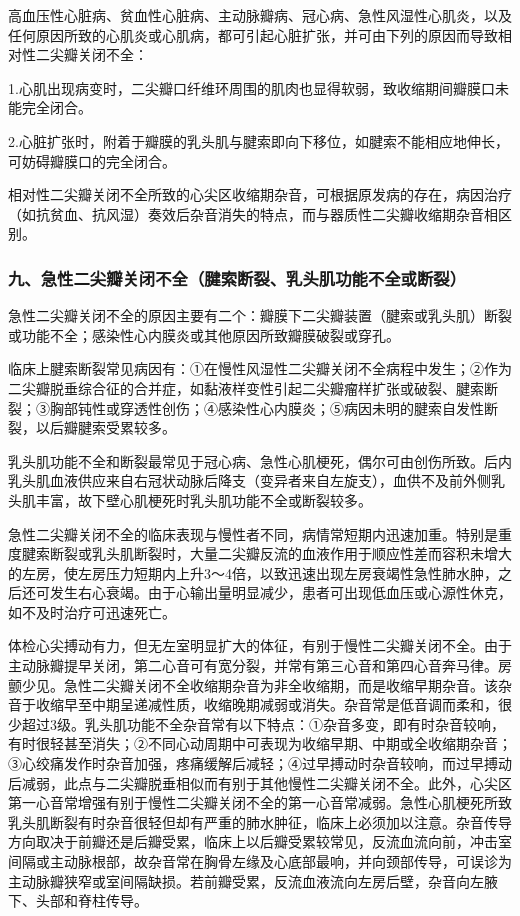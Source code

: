 高血压性心脏病、贫血性心脏病、主动脉瓣病、冠心病、急性风湿性心肌炎，以及任何原因所致的心肌炎或心肌病，都可引起心脏扩张，并可由下列的原因而导致相对性二尖瓣关闭不全：

1.心肌出现病变时，二尖瓣口纤维环周围的肌肉也显得软弱，致收缩期间瓣膜口未能完全闭合。

2.心脏扩张时，附着于瓣膜的乳头肌与腱索即向下移位，如腱索不能相应地伸长，可妨碍瓣膜口的完全闭合。

相对性二尖瓣关闭不全所致的心尖区收缩期杂音，可根据原发病的存在，病因治疗（如抗贫血、抗风湿）奏效后杂音消失的特点，而与器质性二尖瓣收缩期杂音相区别。

\subsubsection{九、急性二尖瓣关闭不全（腱索断裂、乳头肌功能不全或断裂）}

急性二尖瓣关闭不全的原因主要有二个：瓣膜下二尖瓣装置（腱索或乳头肌）断裂或功能不全；感染性心内膜炎或其他原因所致瓣膜破裂或穿孔。

临床上腱索断裂常见病因有：①在慢性风湿性二尖瓣关闭不全病程中发生；②作为二尖瓣脱垂综合征的合并症，如黏液样变性引起二尖瓣瘤样扩张或破裂、腱索断裂；③胸部钝性或穿透性创伤；④感染性心内膜炎；⑤病因未明的腱索自发性断裂，以后瓣腱索受累较多。

乳头肌功能不全和断裂最常见于冠心病、急性心肌梗死，偶尔可由创伤所致。后内乳头肌血液供应来自右冠状动脉后降支（变异者来自左旋支），血供不及前外侧乳头肌丰富，故下壁心肌梗死时乳头肌功能不全或断裂较多。

急性二尖瓣关闭不全的临床表现与慢性者不同，病情常短期内迅速加重。特别是重度腱索断裂或乳头肌断裂时，大量二尖瓣反流的血液作用于顺应性差而容积未增大的左房，使左房压力短期内上升3～4倍，以致迅速出现左房衰竭性急性肺水肿，之后还可发生右心衰竭。由于心输出量明显减少，患者可出现低血压或心源性休克，如不及时治疗可迅速死亡。

体检心尖搏动有力，但无左室明显扩大的体征，有别于慢性二尖瓣关闭不全。由于主动脉瓣提早关闭，第二心音可有宽分裂，并常有第三心音和第四心音奔马律。房颤少见。急性二尖瓣关闭不全收缩期杂音为非全收缩期，而是收缩早期杂音。该杂音于收缩早至中期呈递减性质，收缩晚期减弱或消失。杂音常是低音调而柔和，很少超过3级。乳头肌功能不全杂音常有以下特点：①杂音多变，即有时杂音较响，有时很轻甚至消失；②不同心动周期中可表现为收缩早期、中期或全收缩期杂音；③心绞痛发作时杂音加强，疼痛缓解后减轻；④过早搏动时杂音较响，而过早搏动后减弱，此点与二尖瓣脱垂相似而有别于其他慢性二尖瓣关闭不全。此外，心尖区第一心音常增强有别于慢性二尖瓣关闭不全的第一心音常减弱。急性心肌梗死所致乳头肌断裂有时杂音很轻但却有严重的肺水肿征，临床上必须加以注意。杂音传导方向取决于前瓣还是后瓣受累，临床上以后瓣受累较常见，反流血流向前，冲击室间隔或主动脉根部，故杂音常在胸骨左缘及心底部最响，并向颈部传导，可误诊为主动脉瓣狭窄或室间隔缺损。若前瓣受累，反流血液流向左房后壁，杂音向左腋下、头部和脊柱传导。

